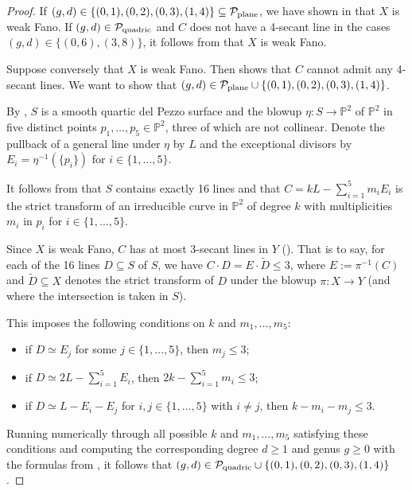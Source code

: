 \documentclass[english,11pt,reqno]{amsart}
\newcommand{\sub}{\subseteq}
\newcommand{\Ptwo}{\mathbb{P}^2}
\begin{document}
\begin{proof}
If $(g,d)\in \{(0,1), (0,2), (0,3), (1,4)\}\sub \mathcal{P}_{\textup{plane}}$, we have shown in  that $X$ is weak Fano.	If $(g,d)\in \mathcal{P}_{\textup{quadric}}$ and $C$ does not have a 4-secant line in the cases $(g,d)\in \{(0,6),(3,8)\}$, it follows from  that $X$ is weak Fano.  \par
Suppose conversely that $X$ is weak Fano. Then  shows that $C$ cannot admit any 4-secant lines. We want to show that $(g,d)\in \mathcal{P}_{\textup{plane}}\cup \{(0,1), (0,2), (0,3), (1,4)\}$. \par 
By , $S$ is a smooth quartic del Pezzo surface and the blowup $\eta:S\rightarrow \Ptwo$ of $\Ptwo$ in five distinct points $p_1,\dots,p_5\in \Ptwo$, three of which are not collinear. Denote the pullback of a general line under $\eta$ by $L$ and the exceptional divisors by $E_i=\eta^{-1}(\{p_i\})$ for $i\in \{1,\dots,5\}$. \par
It follows from  that $S$ contains exactly 16 lines and that $C= kL - \sum_{i=1}^5 m_i E_i$ is the strict transform of an irreducible curve in $\Ptwo$ of degree $k$ with multiplicities $m_i$ in $p_i$ for $i\in\{1,\dots,5\}$. \par
Since $X$ is weak Fano, $C$ has at most 3-secant lines in $Y$ (). That is to say, for each of the 16 lines $D \sub S$ of $S$, we have $C\cdot D = E \cdot \widetilde{D} \leq 3$, where $E:=\pi^{-1}(C)$ and $\widetilde{D}\sub X$ denotes the strict transform of $D$ under the blowup $\pi:X\rightarrow Y$ (and where the intersection is taken in $S$). \par 
This imposes the following conditions on $k$ and $m_1,\dots,m_5$:
\begin{itemize}
\item if $D \simeq E_j$ for some $j\in\{1,\dots,5\}$, then $m_j\leq 3$;
\item if $D \simeq 2 L - \sum_{i=1}^5 E_i $, then $2k-\sum_{i=1}^5 m_i \leq 3$;
\item if $D \simeq L-E_i-E_j$ for $i,j\in\{1,\dots,5\}$ with $i\not=j$, then $k-m_i-m_j\leq 3$.
\end{itemize}
Running numerically through all possible $k$ and $m_1,\dots,m_5$ satisfying these conditions and computing the corresponding degree $d\geq 1$ and genus $g\geq 0$ with the formulas from , it follows that $(g,d)\in \mathcal{P}_{\textup{quadric}} \cup \{(0,1), (0,2), (0,3), (1,4)\}$.
\end{proof}
%
%
\end{document}
